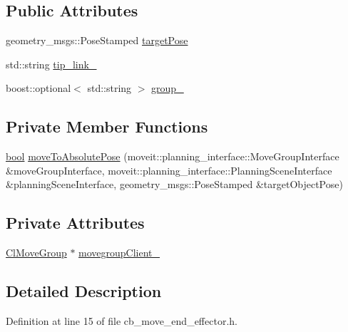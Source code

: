 \subsection*{Public Attributes}
\begin{DoxyCompactItemize}
\item 
geometry\+\_\+msgs\+::\+Pose\+Stamped \hyperlink{classmoveit__z__client_1_1CbMoveEndEffector_abea9c6077733077baced34c6098c6140}{target\+Pose}
\item 
std\+::string \hyperlink{classmoveit__z__client_1_1CbMoveEndEffector_abd92e9d3d67bdde11f9e38e0b44a2b8b}{tip\+\_\+link\+\_\+}
\item 
boost\+::optional$<$ std\+::string $>$ \hyperlink{classmoveit__z__client_1_1CbMoveEndEffector_ab2d23ae054dbc0c2a5f3e6bbc84e07dd}{group\+\_\+}
\end{DoxyCompactItemize}
\subsection*{Private Member Functions}
\begin{DoxyCompactItemize}
\item 
\hyperlink{classbool}{bool} \hyperlink{classmoveit__z__client_1_1CbMoveEndEffector_a4b77954562c23ba6d0aa0f9c805dfd8d}{move\+To\+Absolute\+Pose} (moveit\+::planning\+\_\+interface\+::\+Move\+Group\+Interface \&move\+Group\+Interface, moveit\+::planning\+\_\+interface\+::\+Planning\+Scene\+Interface \&planning\+Scene\+Interface, geometry\+\_\+msgs\+::\+Pose\+Stamped \&target\+Object\+Pose)
\end{DoxyCompactItemize}
\subsection*{Private Attributes}
\begin{DoxyCompactItemize}
\item 
\hyperlink{classmoveit__z__client_1_1ClMoveGroup}{Cl\+Move\+Group} $\ast$ \hyperlink{classmoveit__z__client_1_1CbMoveEndEffector_af62a434c16849885a085e30b8ae70e00}{movegroup\+Client\+\_\+}
\end{DoxyCompactItemize}


\subsection{Detailed Description}


Definition at line 15 of file cb\+\_\+move\+\_\+end\+\_\+effector.\+h.



